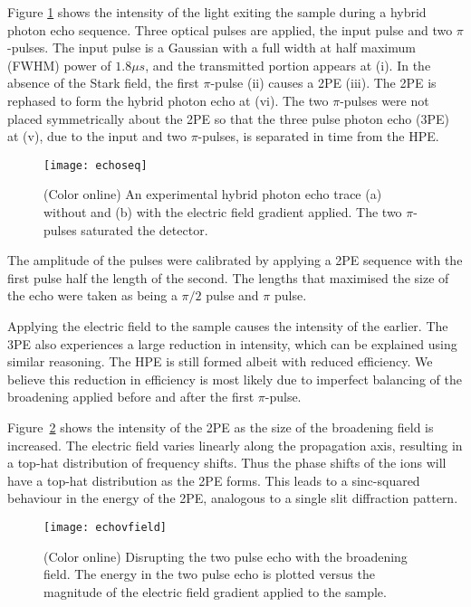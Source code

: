                                                                                                                                                                                                                                                                                                                                                                                                                                                                                                                                                                                                                                                                                                                                                                                                                                                                                                                                                                                                                                                                                                                                                                                                                                                                                                                                                                                                                                                                                                                                                                                                                                                                                                                                                                                                                                                                                                                                                                                                                                                                                                                                                                                                                                                                                                                                                                                                                                                                                                                                                                                                                                                                                                                                                                                                                                                                                                                                                                                                                                                                                                                                                                                                                                                                                                                                                                                                                                                                                                                                                                                                                                                                                                                                                                                                                                                                                                                                                                                                                                                                                                                                                                                                                                                                                                                                                                                                                                                                                                                                                                                                                                                                                                                                                                                                                                                                                                                                                                                                                                                                                                                                                                                                                                                                                                                                                                                                                                                                                                                                                                                                                                                                                                                                                                                                                                                                                                                                                                                                                                                                                                                                                                                                                                                                                                                                                                                                                                                                                                                                                                                                                                                                                                                                                                                                                                                                                                                                                                                                                                                                                                                                                                                                                                                                                                                                                                                                                                                                                                                                                                                                                                                                                                                                                                                                                                                                                                                                                                                                                                                                                                                                                                                                                                                                                                                                                                                                                                                                                                                                                                                                                                                                                                                                                                                                                                                                                                                                                                                                                                                                                                                                                                                                                                                                                                                                                                                                                                                                                                                                                                                                                                                                                                                                                                                                                                                                                                                                                                                                                                                                                                                                                                                                                                                                                                                                                                                                                                                                                                                                                                                                                                                                                                                                                                                                                                                                                                                                                                                                                                                                                                                                                                                                                                                                                                                                                                                                                                                                                                                                                                                                                                                                                                                                                                                                                                                                                                                                                                                                                                                                                                                                                                                                                                                                                                                                                                                                                                                                                                                                                                                                                                                                                                                                                                                                                                                                                                                                                                                                                                                                                                                                                                                                                                                                                                                                                                                                                                                                                                                                                                                                                                                                                                                                                                                                                                                                                                                                                                                                                                                                                                                                                                                                                                                                                                                                                                                                                                                                                                                                                                                                                                                                                                                                                                                                                                                                                                                                                                                                                                                                                                                                                                                                                                                                                                                                                                                                                                                                                                                                                                                                                                                                                                                                                                                                                                                                                                                                                                                                                                                                                                                                                                                                                                                                                                                                                                                                                                                                                                                                                                                                                                                                                                                                                                                                                                                                                                                                                                                                                                                                                                                                                                                                                                                                                                                                                                                                                                                                                                                                                                                                                                                                                                                                                                                                                                                                                                                                                                                                                                                                                                                                                                                                                                                                                                                                                                                                                                                                                                                                                                                                                                                                                                                                                                                                                                                                                                                                                                                                                                                                                                                                                                                                                                                                                                                                                                                                                                                                                                                                                                                                                                                                                                                                                                                                                                                                                                                                                                                                                                                                                                                                                                                                                                                                                                                                                                                                                                                                                                                                                                                                                                                                                                                                                                                                                                                                                                                                                                                                                                                                                                                                                                                                                                                                                                                                                                                                                                                                                                                                                                                                                                                                                                                                                                                                                                                                                                                                                                                                                                                                                                                                                                                                                                                                                                                                                                                                                                                                                                                                                                                                                                                                                                                                                                                                                                                                                                                                                                                                                                                                                                                                                                                                                                                                                                                                                                                                                                                                                                                                                                                                                                                                                                                                                                                                                                                                                                                                                                                                                                                                                                                                                                                                                                                                                                                                                                                                                                                                                                                                                                                                                                                                                                                                                                                                                                                                                                                                                                                                                                                                                                                                                                                                                                                                                                                                                                                                                                                                                                                                                                                                                                                                                                                                                                                                                                                                                                                                                                                                                                                                                                                                                                                                                                                                                                                                                                                                                                                                                                                                                                                                                                                                                                                                                                                                                                                                                                                                                                                                                                                                                                                                                                                                                                                                                                                                                                                                                                                                                                                                                                                                                                                                                                                                                                                                                                                                                                                                                                                                                                                                                                                                                                                                                                                                                                                                                                                                                                                                                                                                                                                                                                                                                                                                                                                                                                                                                                                                                                                                                                                                                                                                                                                                                                                                                                                                                                                                                                                                                                                                                                                                                                                                                                                                                                                                                                                                                                                                                                                                                                                                                                                                                                                                                                                                                                                                                                                                                                                                                                                                                                                                                                                                                                                                                                                                                                                                                                                                                                                                                                                                                                                                                                                                                                                                                                                                                                                                                                                                                                                                                                                                                                                                                                                                                                                                                                                                                                                                                                                                                                                                                                                                                                                                                                                                                                                                                                                                                                                                                                                                                                                                                                                                                                                                                                                                                                                                                                                                                                                                                                                                                                                                                                                                                                                                                                                                                                                                                                                                                                                                                                                                                                                                                                                                                                                                                                                                                                                                                                                                                                                                                                                                                                                                                                                                                                                                                                                                                                                                                                                                                                                                                                                                                                                                                                                                                                                                                                                                                                                                                                                                                                                                                                                                                                                                                                                                                                                                                                                                                                                                                                                                                                                                                                                                                                                                                                                                                                                                                                                                                                                                                                                                                                                                                                                                                                                                                                                                                                                                                                                                                                                                                                                                                                                                                                                                                                                                                                                                                                                                                                                                                                                                                                                                                                                                                                                                                                                                                                                                                                                                                                                                                                                                                                                                                                                                                                                                                                                                                                                                                                                                                                                                                                                                                                                                                                                                                                                                                                                                                                                                                                                                                                                                                                                                                                                                                                                                                                                                                                                                                                                                                                                                                                                                                                                                                                                                                                                                                                                                                                                                                                                                                                                                                                                                                                                                                                                                                                                                                                                                                                                                                                                                                                                                                                                                                                                                                                                                                                                                                                                                                                                                                                                                                                                                                                                                                                                                                                                                                                                                                                                                                                                                                                                                                                                                                                                                                                                                                                                                                                                                                                                                                                                                                                                                                                                                                                                                                                                                                                                                                                                                                                                                                                                                                                                                                                                                                                                                                                                                                                                                                                                                                                                                                                                                                                                                                                                                                                                                                                                                                                                                                                                                                                                                                                                                                                                                                                                                                                                                                                                                                                                                                                                                                                                                                                                                                                                                                                                                                                                                                                                                                                                                                                                                                                                                                                                                                                                                                                                                                                                                                                                                                                                                                                                                                                                                                                                                                                                                                                                                                                                                                                                                                                                                                                                                                                                                                                                                                                                                                                                                                                                                                                                                                                                                                                                                                                                                                                                                                                                                                                                                                                                                                                                                                                                                                                                                                                                                                                                                                                                                                                                                                                                                                                                                                                                                                                                                                                                                                                                                                                                                                                                                                                                                                                                                                                                                                                                                                                                                                                                                                                                                                                                                                                                                                                                                                                                                                                                                                                                                                                                                                                                                                                                                                                                                                                                                                                                                                                                                                                                                                                                                                                                                                                                                                                                                                                                                                                                                                                                                                                                                                                                                                                                                                                                                                                                                                                                                                                                                                                                                                                                                                                                                                                                                                                                                                                                                                                                                                                                                                                                                                                                                                                                                                                                                                                                                                                                                                                                                                                                                                                                                                                                                                                                                                                                                                                                                                                                                                                                                                                                                                                                                                                                                                                                                                                                                                                                                                                                                                                                                                                                                                                                                                                                                                                                                                                                                                                                                                                                    \documentclass[superscriptaddress,pra,twocolumn,showpacs,amsmath,amssymb,aps,a4paper]{revtex4}
\begin{document}
Figure \ref{fig:echoseq} shows the intensity of the light exiting the
sample during a hybrid photon echo sequence. Three optical pulses are
applied, the input pulse and two $\pi$-pulses. The input pulse is a
Gaussian with a full width at half maximum (FWHM) power of $1.8 \mu
s$, and the transmitted portion appears at (i). In the absence of the
Stark field, the first $\pi$-pulse (ii) causes a 2PE (iii). The 2PE is
rephased to form the hybrid photon echo at (vi). The two $\pi$-pulses
were not placed symmetrically about the 2PE so that the three pulse photon echo (3PE) at (v), due
to the input and two $\pi$-pulses, is separated in time from the HPE.

\begin{figure}
  \centering
  \texttt{[image: echoseq]}
  \caption{(Color online) An experimental hybrid photon echo trace (a) without and (b)
    with the electric field gradient applied. The two
    $\pi$-pulses saturated the detector.}
  \label{fig:echoseq}
\end{figure}

The amplitude of the pulses were calibrated by applying a
2PE sequence with the first pulse half the length of the
second. The lengths that maximised the size of the echo were taken as
being a $\pi/2$ pulse and $\pi$ pulse.

Applying the electric field to the sample causes the intensity of the
 %
earlier. The 3PE also experiences a large reduction in intensity,
which can be explained using similar reasoning.  The HPE is still
formed albeit with reduced efficiency. We believe this reduction in
efficiency is most likely due to imperfect balancing of the broadening
applied before and after the first $\pi$-pulse.

Figure~\ref{fig:echovfield} shows the intensity of the 2PE
as the size of the broadening field is increased. The
electric field varies linearly along the propagation axis, 
resulting in a top-hat distribution of frequency shifts.  Thus the
phase shifts of the ions will have a top-hat distribution as the 2PE forms.
This leads to a sinc-squared behaviour in the energy of the 2PE, analogous to a single slit diffraction pattern.


\begin{figure}  \centering
  \texttt{[image: echovfield]}
  \caption{(Color online) \label{fig:echovfield} Disrupting the two
    pulse echo with
    the broadening field. The energy in the two pulse echo is plotted
    versus the magnitude of the electric field gradient applied to the
    sample.}
\end{figure}
\end{document}
